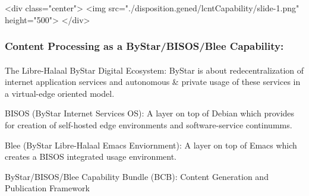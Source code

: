 \begin{whenOrg}
\begin{htmlonly}

\begin{frame}[fragile,plain,label=lcntCapability]
    \frametitle{}
    \framesubtitle{}
    \begin{rawhtml}
<div class="center">
<img src="./disposition.gened/lcntCapability/slide-1.png" height="500">
</div>
    \end{rawhtml}
\end{frame}
\end{htmlonly}

\begin{verblatex}

\begin{frame}[fragile,plain,label=lcntCapability]
    \frametitle{Content Processing as a ByStar/BISOS/Blee Capability:}
    \framesubtitle{}


    \begin{block}{The Libre-Halaal ByStar Digital Ecosystem:}
           ByStar is about redecentralization of internet application services and autonomous \& private usage of these services in a virtual-edge oriented model.
    \end{block}

    \begin{block}{BISOS (ByStar Internet Services OS):}
           A layer on top of Debian which provides for creation of self-hosted edge environments and software-service continumms.
    \end{block}

    \begin{block}{Blee (ByStar Libre-Halaal Emacs Enviornment):}
           A layer on top of Emacs which creates a BISOS integrated usage environment.
    \end{block}

    \begin{exampleblock}{ByStar/BISOS/Blee Capability Bundle (BCB):}
          Content Generation and Publication Framework
    \end{exampleblock}


\end{frame}
\end{verblatex}
\end{whenOrg}
